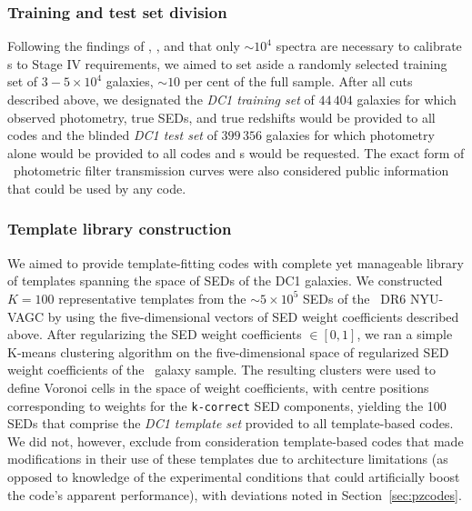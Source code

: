 \subsubsection{Training and test set division}
\label{sec:buzztraining}

Following the findings of \citet{Bernstein:10}, \citet{Newman:2015}, and \citet{Masters:2015} that only $\sim\!10^{4}$ spectra are necessary to calibrate \pz s to Stage IV requirements, we aimed to set aside a randomly selected training set of $3-5\times 10^{4}$ galaxies, $\sim 10$ per cent of the full sample.
After all cuts described above, we designated the \textit{DC1 training set} of $44\,404$ galaxies for which observed photometry, true SEDs, and true redshifts would be provided to all codes and the blinded \textit{DC1 test set} of $399\,356$ galaxies for which photometry alone would be provided to all codes and \pzpdf s would be requested.
The exact form of \lsst\ photometric filter transmission curves were also considered public information that could be used by any code.

\subsubsection{Template library construction}
\label{sec:buzztemplates}

We aimed to provide template-fitting codes with complete yet manageable library of templates spanning the space of SEDs of the DC1 galaxies.
We constructed $K=100$ representative templates from the $\sim 5 \times 10^{5}$ SEDs of the \sdss\ DR6 NYU-VAGC by using the five-dimensional vectors of SED weight coefficients described above.
After regularizing the SED weight coefficients $\in [0, 1]$, we ran a simple K-means clustering algorithm on the five-dimensional space of regularized SED weight coefficients of the \sdss\ galaxy sample.
The resulting clusters were used to define Voronoi cells in the space of weight coefficients, with centre positions corresponding to weights for the \texttt{k-correct} SED components, yielding the 100 SEDs that comprise the \textit{DC1 template set} provided to all template-based codes.
We did not, however, exclude from consideration template-based codes that made modifications in their use of these templates due to architecture limitations (as opposed to knowledge of the experimental conditions that could artificially boost the code's apparent performance), with deviations noted in Section~\ref{sec:pzcodes}.
